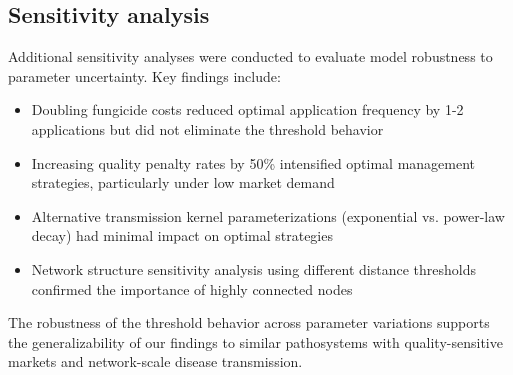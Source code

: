 \documentclass[10pt,a4paper]{article}
\begin{document}
\newpage
\subsection{Sensitivity analysis}

Additional sensitivity analyses were conducted to evaluate model robustness to parameter uncertainty. Key findings include:

\begin{itemize}
\item Doubling fungicide costs reduced optimal application frequency by 1-2 applications but did not eliminate the threshold behavior
\item Increasing quality penalty rates by 50\% intensified optimal management strategies, particularly under low market demand
\item Alternative transmission kernel parameterizations (exponential vs. power-law decay) had minimal impact on optimal strategies
\item Network structure sensitivity analysis using different distance thresholds confirmed the importance of highly connected nodes
\end{itemize}

The robustness of the threshold behavior across parameter variations supports the generalizability of our findings to similar pathosystems with quality-sensitive markets and network-scale disease transmission.
\end{document}
